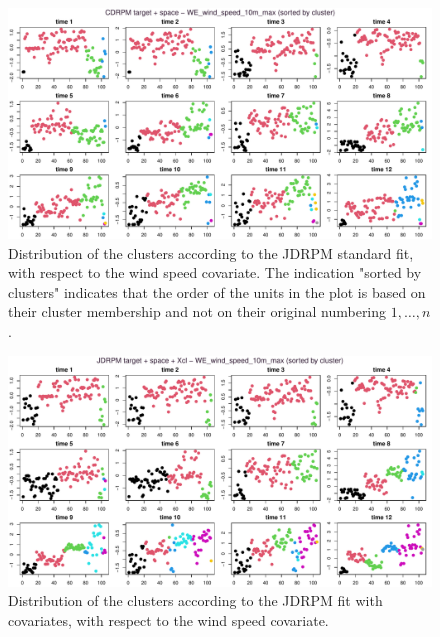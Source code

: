 \documentclass[12pt,	%
	a4paper,		%
	twoside,		%
	openright,		%
	titlepage,%
	]{book}
\theoremstyle{definition}
\begin{document}
\begin{figure}[!ht]
    \centering
    \includegraphics[width=1\linewidth]{Testing/Covariates/in clustering/space C/WE_wind_speed_10m_max_sorted.pdf}
    \caption[CDRPM standard fit, clusters distribution with respect to the wind speed covariate]{Distribution of the clusters according to the JDRPM standard fit, with respect to the wind speed covariate. The indication "sorted by clusters" indicates that the order of the units in the plot is based on their cluster membership and not on their original numbering $1,\ldots,n$.}
    \label{fig: C wind max sorted by cl}
\end{figure}


\begin{figure}[!ht]
    \centering
    \includegraphics[width=1\linewidth]{Testing/Covariates/in clustering/space J Xcl/WE_wind_speed_10m_max_sorted.pdf}
    \caption[JDRPM fit with covariates, clusters distribution with respect to the wind speed covariate]{Distribution of the clusters according to the JDRPM fit with covariates, with respect to the wind speed covariate.}    \label{fig: JXcl wind max sorted by cl}
\end{figure}
\end{document}
